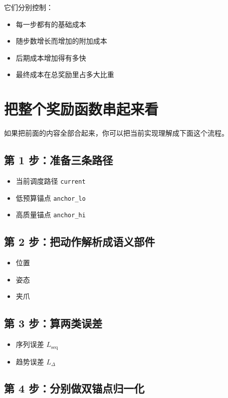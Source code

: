 \documentclass[12pt]{ctexart}
\begin{document}
它们分别控制：

\begin{itemize}
    \item 每一步都有的基础成本
    \item 随步数增长而增加的附加成本
    \item 后期成本增加得有多快
    \item 最终成本在总奖励里占多大比重
\end{itemize}

\section{把整个奖励函数串起来看}

如果把前面的内容全部合起来，你可以把当前实现理解成下面这个流程。

\subsection{第 1 步：准备三条路径}

\begin{itemize}
    \item 当前调度路径 \texttt{current}
    \item 低预算锚点 \texttt{anchor\_lo}
    \item 高质量锚点 \texttt{anchor\_hi}
\end{itemize}

\subsection{第 2 步：把动作解析成语义部件}

\begin{itemize}
    \item 位置
    \item 姿态
    \item 夹爪
\end{itemize}

\subsection{第 3 步：算两类误差}

\begin{itemize}
    \item 序列误差 $L_{\text{seq}}$
    \item 趋势误差 $L_{\Delta}$
\end{itemize}

\subsection{第 4 步：分别做双锚点归一化}
\end{document}
